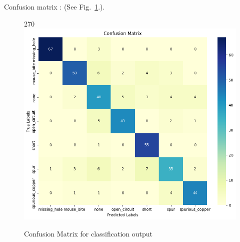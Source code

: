 \documentclass[12pt]{article}
\begin{document}
Confusion matrix : (See Fig.~\ref{fig:confusion}.).
\begin{figure}[p]
    \centering
    \begin{turn}{270}
    \includegraphics[width=1\paperwidth,height=1\paperheight,keepaspectratio]{./graphics/confusionmatrix.png}
    \end{turn}
    \caption{Confusion Matrix for classification output}
    \label{fig:confusion}
\end{figure}
\restoregeometry
\end{document}
